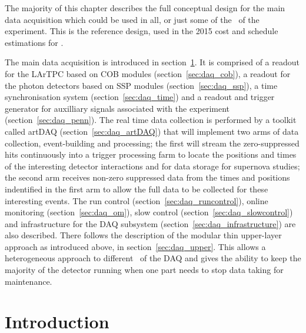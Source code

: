 The majority of this chapter describes the full conceptual design for
the main data acquisition which could be used in all, or just some of
the \COMPARTMENTS\ of the experiment.  This is the reference design,
used in the 2015 cost and schedule estimations for \LBNE.  


The main data acquisition is introduced in
section~\ref{sec:daq_intro}.  It is comprised of a readout for the
LArTPC based on COB modules (section~\ref{sec:daq_cob}), a readout for
the photon detectors based on SSP modules (section~\ref{sec:daq_ssp}),
a time synchronisation system (section~\ref{sec:daq_time}) and a
readout and trigger generator for auxilliary signals associated with
the experiment (section~\ref{sec:daq_penn}).  The real time data
collection is performed by a toolkit called artDAQ
(section~\ref{sec:daq_artDAQ}) that will implement two arms of data
collection, event-building and processing; the first will stream the
zero-suppressed hits continuously into a trigger processing farm to
locate the positions and times of the interesting detector
interactions and for data storage for supernova studies; the second
arm receives non-zero suppressed data from the times and positions
indentified in the first arm to allow the full data to be collected
for these interesting events.  The run control
(section~\ref{sec:daq_runcontrol}), online monitoring
(section~\ref{sec:daq_om}), slow control
(section~\ref{sec:daq_slowcontrol}) and infrastructure for the DAQ
subsystem (section~\ref{sec:daq_infrastructure}) are also described.
There follows the description of the modular thin upper-layer approach
as introduced above, in section~\ref{sec:daq_upper}.  This allows a
heterogeneous approach to different \COMPARTMENTS\ of the DAQ and
gives the ability to keep the majority of the detector running when
one part needs to stop data taking for maintenance.

\section{Introduction}
\label{sec:daq_intro}

